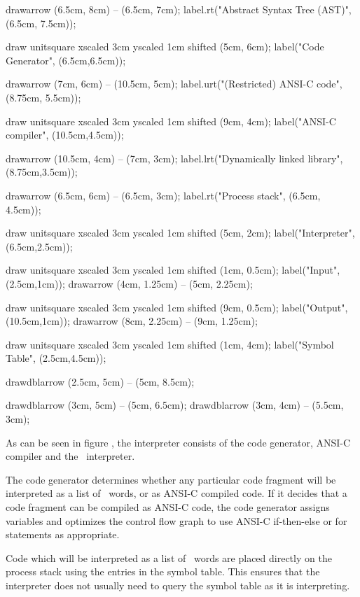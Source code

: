 drawarrow (6.5cm, 8cm)  -- (6.5cm, 7cm);
label.rt("Abstract Syntax Tree (AST)", (6.5cm, 7.5cm));

draw unitsquare xscaled 3cm yscaled 1cm shifted (5cm, 6cm);
label("Code Generator", (6.5cm,6.5cm));

drawarrow (7cm, 6cm)    -- (10.5cm, 5cm);
label.urt("(Restricted) ANSI-C code", (8.75cm, 5.5cm));

draw unitsquare xscaled 3cm yscaled 1cm shifted (9cm, 4cm);
label("ANSI-C compiler", (10.5cm,4.5cm));

drawarrow (10.5cm, 4cm) -- (7cm, 3cm);
label.lrt("Dynamically linked library", (8.75cm,3.5cm));

drawarrow (6.5cm, 6cm)  -- (6.5cm, 3cm);
label.rt("Process stack", (6.5cm, 4.5cm));

draw unitsquare xscaled 3cm yscaled 1cm shifted (5cm, 2cm);
label("Interpreter", (6.5cm,2.5cm));

draw unitsquare xscaled 3cm yscaled 1cm shifted (1cm, 0.5cm);
label("Input", (2.5cm,1cm));
drawarrow (4cm, 1.25cm)  -- (5cm, 2.25cm);

draw unitsquare xscaled 3cm yscaled 1cm shifted (9cm, 0.5cm);
label("Output", (10.5cm,1cm));
drawarrow (8cm, 2.25cm)  -- (9cm, 1.25cm);

draw unitsquare xscaled 3cm yscaled 1cm shifted (1cm, 4cm);
label("Symbol Table", (2.5cm,4.5cm));

drawdblarrow (2.5cm, 5cm)  -- (5cm, 8.5cm);

drawdblarrow (3cm, 5cm) -- (5cm, 6.5cm);
drawdblarrow (3cm, 4cm) -- (5.5cm, 3cm);
\stopMPcode\egroup

As can be seen in figure , the interpreter consists of 
the code generator, ANSI-C compiler and the \joylol\ interpreter. 

\startitemize[2]

\item {}

The code generator determines whether any particular code fragment will be 
interpreted as a list of \joylol\ words, or as ANSI-C compiled code. If it 
decides that a code fragment can be compiled as ANSI-C code, the code 
generator assigns variables and optimizes the control flow graph to use 
ANSI-C if-then-else or for statements as appropriate. 

Code which will be interpreted as a list of \joylol\ words are placed 
directly on the process stack using the entries in the symbol table. This 
ensures that the interpreter does not usually need to query the symbol 
table as it is interpreting. 

